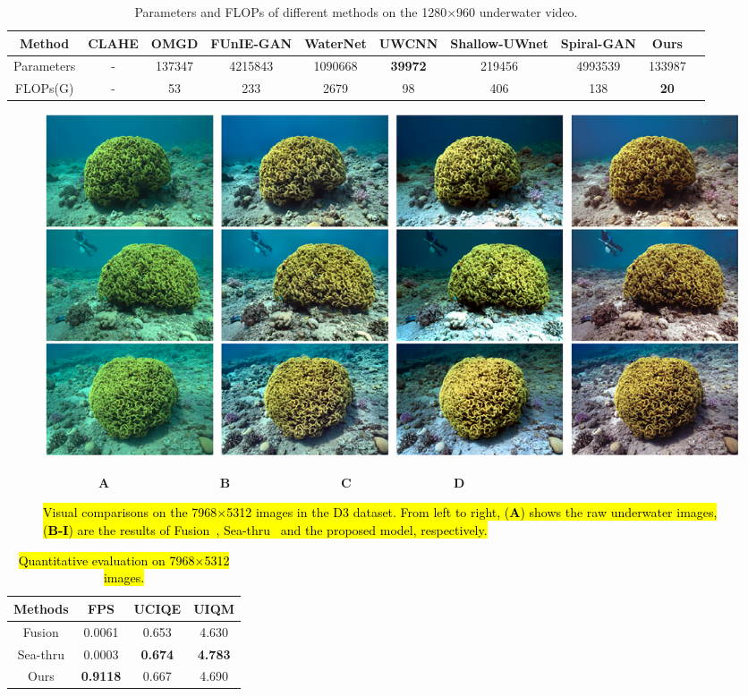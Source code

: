 \documentclass[utf8]{FrontiersinHarvard} %
\begin{document}
\begin{table}[htbp]\normalsize
\centering
\setlength\tabcolsep{2pt}
\caption{Parameters and FLOPs of different methods on the 1280$\times$960 underwater video.}
\begin{tabular}{c|ccccccccc}
\hline  
Method&CLAHE&OMGD&FUnIE-GAN&WaterNet&UWCNN&Shallow-UWnet&Spiral-GAN&Ours\\
\hline 
Parameters&-&137347&4215843&1090668&\textbf{39972}&219456&4993539&133987\\
\hline 
FLOPs(G)&-&53&233&2679&98&406&138&\textbf{20}\\
\hline 
\end{tabular}
\label{tbl:comparison-underwatervideo}
\end{table}

\begin{figure}[htbp]
\begin{center}
\includegraphics[width=1\textwidth]{FSpiralGAN_frontiers/onepicture/D3300.jpg}
\end{center}
$~~~~~~~~~~~~~~~~~~~~$\textbf{A}$~~~~~~~~~~~~~~~~~~~~~~~~~~~~~~~~~~~~~~~~$\textbf{B}$~~~~~~~~~~~~~~~~~~~~~~~~~~~~~~~~~~~~~~~~$\textbf{C}$~~~~~~~~~~~~~~~~~~~~~~~~~~~~~~~~~~~~~$\textbf{D}
 \caption{\hl{Visual comparisons on the 7968$\times$5312 images in the D3 dataset. From left to right, (\textbf{A}) shows the raw underwater images, (\textbf{B-I}) are the results of Fusion~\citep{2012Enhancing}, Sea-thru~\citep{akkaynak2019sea} and the proposed model, respectively.} \label{fig:D3}}
\end{figure}

\begin{table}[htbp]\normalsize
\centering
\setlength\tabcolsep{15pt}
\caption{\hl{Quantitative evaluation on 7968$\times$5312 images.}}
\begin{tabular}{c|ccc}
\hline  
Methods&FPS&UCIQE&UIQM\\
\hline 
Fusion&0.0061&0.653&4.630\\ 
\hline
Sea-thru&0.0003&\textbf{0.674}&\textbf{4.783}\\
\hline
Ours&\textbf{0.9118}&0.667&4.690\\
\hline 
\end{tabular}
\label{tbl:D3}
\end{table}
\end{document}
